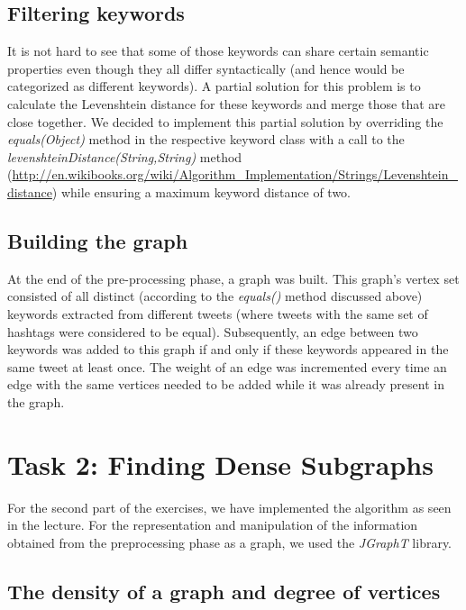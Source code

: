 \documentclass[10pt,a4paper]{article}
\begin{document}
\subsection{Filtering keywords}
It is not hard to see that some of those keywords can share certain semantic properties even though they all differ syntactically (and hence would be categorized as different keywords). A partial solution for this problem is to calculate the Levenshtein distance for these keywords and merge those that are close together. We decided to implement this partial solution by overriding the \emph{equals(Object)} method in the respective keyword class with a call to the \emph{levenshteinDistance(String,String)} method (\url{http://en.wikibooks.org/wiki/Algorithm_Implementation/Strings/Levenshtein_distance}) while ensuring a maximum keyword distance of two.
\subsection{Building the graph}
At the end of the pre-processing phase, a graph was built. This graph's vertex set consisted of all distinct (according to the \emph{equals()} method discussed above) keywords extracted from different tweets (where tweets with the same set of hashtags were considered to be equal). Subsequently, an edge between two keywords was added to this graph if and only if these keywords appeared in the same tweet at least once. The weight of an edge was incremented every time an edge with the same vertices needed to be added while it was already present in the graph.
\section{Task 2: Finding Dense Subgraphs}

For the second part of the exercises, we have implemented the algorithm as seen in the lecture.
For the representation and manipulation of the information obtained from the preprocessing phase as a graph, we used the \emph{JGraphT} library.

\subsection{The density of a graph and degree of vertices}
\end{document}
